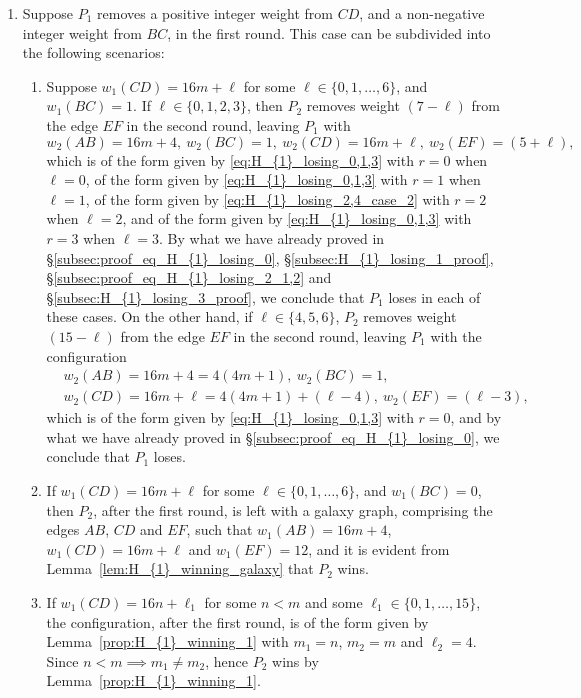 \documentclass[11pt,reqno]{amsart}
\theoremstyle{definition}
\theoremstyle{definition}
\begin{document}
\begin{enumerate}
\item Suppose $P_{1}$ removes a positive integer weight from $CD$, and a non-negative integer weight from $BC$, in the first round. This case can be subdivided into the following scenarios:
\begin{enumerate}
\item Suppose $w_{1}(CD)=16m+\ell$ for some $\ell \in \{0,1,\ldots,6\}$, and $w_{1}(BC)=1$. If $\ell \in \{0,1,2,3\}$, then $P_{2}$ removes weight $(7-\ell)$ from the edge $EF$ in the second round, leaving $P_{1}$ with
\begin{equation}
w_{2}(AB)=16m+4,\ w_{2}(BC)=1,\ w_{2}(CD)=16m+\ell,\ w_{2}(EF)=(5+\ell),\nonumber
\end{equation}
which is of the form given by \eqref{eq:H_{1}_losing_0,1,3} with $r=0$ when $\ell=0$, of the form given by \eqref{eq:H_{1}_losing_0,1,3} with $r=1$ when $\ell=1$, of the form given by \eqref{eq:H_{1}_losing_2,4_case_2} with $r=2$ when $\ell=2$, and of the form given by \eqref{eq:H_{1}_losing_0,1,3} with $r=3$ when $\ell=3$. By what we have already proved in \S\ref{subsec:proof_eq_H_{1}_losing_0}, \S\ref{subsec:H_{1}_losing_1_proof}, \S\ref{subsec:proof_eq_H_{1}_losing_2_1,2} and \S\ref{subsec:H_{1}_losing_3_proof}, we conclude that $P_{1}$ loses in each of these cases. On the other hand, if $\ell \in \{4,5,6\}$, $P_{2}$ removes weight $(15-\ell)$ from the edge $EF$ in the second round, leaving $P_{1}$ with the configuration
\begin{align}
{}&w_{2}(AB)=16m+4=4(4m+1),\ w_{2}(BC)=1,\nonumber\\
{}&w_{2}(CD)=16m+\ell=4(4m+1)+(\ell-4),\ w_{2}(EF)=(\ell-3),\nonumber
\end{align}
which is of the form given by \eqref{eq:H_{1}_losing_0,1,3} with $r=0$, and by what we have already proved in \S\ref{subsec:proof_eq_H_{1}_losing_0}, we conclude that $P_{1}$ loses.

\item If $w_{1}(CD)=16m+\ell$ for some $\ell \in \{0,1,\ldots,6\}$, and $w_{1}(BC)=0$, then $P_{2}$, after the first round, is left with a galaxy graph, comprising the edges $AB$, $CD$ and $EF$, such that $w_{1}(AB)=16m+4$, $w_{1}(CD)=16m+\ell$ and $w_{1}(EF)=12$, and it is evident from Lemma~\ref{lem:H_{1}_winning_galaxy} that $P_{2}$ wins.

\item If $w_{1}(CD)=16n+\ell_{1}$ for some $n < m$ and some $\ell_{1}\in\{0,1,\ldots,15\}$, the configuration, after the first round, is of the form given by Lemma~\ref{prop:H_{1}_winning_1} with $m_{1}=n$, $m_{2}=m$ and $\ell_{2}=4$. Since $n<m \implies m_{1}\neq m_{2}$, hence $P_{2}$ wins by Lemma~\ref{prop:H_{1}_winning_1}.
\end{enumerate}


\end{enumerate}
\end{document}
